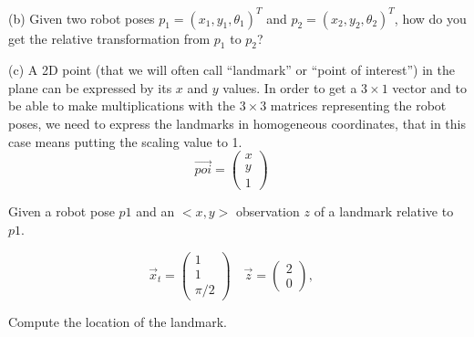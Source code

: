 \documentclass[12pt,a4paper]{article}
\begin{document}
(b) Given two robot poses $p_1=(x_1, y_1, \theta_1)^T$ and $p_2=(x_2, y_2, \theta_2)^T$, how do you get the relative transformation from $p_1$ to $p_2$?

\vspace{2em}
(c) A 2D point (that we will often call ``landmark'' or ``point of interest'') in the plane can be expressed by its $x$ and $y$ values. In order to get a $3 \times 1$ vector and to be able to make multiplications with the $3 \times 3$ matrices representing the robot poses, we need to express the landmarks in homogeneous coordinates, that in this case means putting the scaling value to 1.
\begin{equation*}
      \vec {poi} = \left(\begin{array}{c} x \\ y \\ 1 \end{array}\right) \quad
\end{equation*}

\vspace{1em}

Given a robot pose $p1$ and an $<x,y>$ observation $z$ of a landmark relative to $p1$.

\begin{equation*}
      \vec x_t = \left(\begin{array}{c} 1 \\ 1 \\ \pi/2 \end{array}\right) \quad
      \vec z = \left(\begin{array}{c} 2 \\ 0  \end{array}\right), \quad
\end{equation*}

\vspace{1em}
Compute the location of the  landmark.
\end{document}
